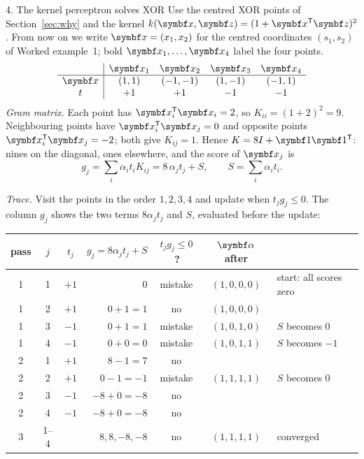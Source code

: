 \documentclass[11pt]{article}
\newcommand{\z}{\vect{z}}
\newcommand{\valpha}{\vect{\alpha}}
\begin{document}
\begin{worked}{4. The kernel perceptron solves XOR}
Use the centred XOR points of Section~\ref{sec:why} and the kernel $k(\x, \z) = (1 + \x\T\z)^2$. From now on we write
$\x = (x_1, x_2)$ for the centred coordinates $(s_1, s_2)$ of Worked example~1; bold $\x_1, \dots, \x_4$ label the four
points.
\[
\begin{array}{c|cccc}
 & \x_1 & \x_2 & \x_3 & \x_4 \\ \hline
 \x & (1, 1) & (-1, -1) & (1, -1) & (-1, 1) \\
 t & +1 & +1 & -1 & -1
\end{array}
\]
\emph{Gram matrix.} Each point has $\x_i\T\x_i = 2$, so $K_{ii} = (1 + 2)^2 = 9$. Neighbouring points have $\x_i\T\x_j = 0$
and opposite points $\x_i\T\x_j = -2$; both give $K_{ij} = 1$. Hence $K = 8I + \vect{1}\vect{1}\T$: nines on the diagonal,
ones elsewhere, and the score of $\x_j$ is
\[
  g_j = \sum_i \alpha_i t_i K_{ij} = 8\,\alpha_j t_j + S, \qquad S = \sum_i \alpha_i t_i .
\]
\noindent\begin{minipage}{\linewidth}
\emph{Trace.} Visit the points in the order $1, 2, 3, 4$ and update when $t_j g_j \le 0$. The column $g_j$ shows the
two terms $8\alpha_jt_j$ and $S$, evaluated before the update:
\begin{center}\small
\begin{tabular}{@{}cccrccl@{}}
\toprule
pass & $j$ & $t_j$ & $g_j = 8\alpha_jt_j + S$ & $t_jg_j \le 0$\,? & $\valpha$ after & \\
\midrule
1 & 1 & $+1$ & $0$ & mistake & $(1,0,0,0)$ & start: all scores zero \\
1 & 2 & $+1$ & $0 + 1 = 1$ & no & $(1,0,0,0)$ & \\
1 & 3 & $-1$ & $0 + 1 = 1$ & mistake & $(1,0,1,0)$ & $S$ becomes $0$ \\
1 & 4 & $-1$ & $0 + 0 = 0$ & mistake & $(1,0,1,1)$ & $S$ becomes $-1$ \\
2 & 1 & $+1$ & $8 - 1 = 7$ & no & & \\
2 & 2 & $+1$ & $0 - 1 = -1$ & mistake & $(1,1,1,1)$ & $S$ becomes $0$ \\
2 & 3 & $-1$ & $-8 + 0 = -8$ & no & & \\
2 & 4 & $-1$ & $-8 + 0 = -8$ & no & & \\
3 & 1--4 & & $8, 8, -8, -8$ & no & $(1,1,1,1)$ & converged \\
\bottomrule
\end{tabular}
\end{center}
\end{minipage}
\smallskip


\end{worked}
\end{document}

